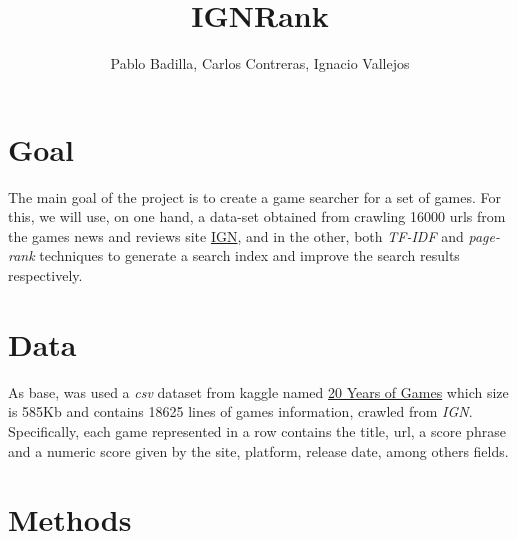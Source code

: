 \documentclass{article}
\newcommand{\instruction}[1]{\textsc{\begin{tcolorbox}#1\end{tcolorbox}}}
\begin{document}
\title{IGNRank}
\author{Pablo Badilla, Carlos Contreras, Ignacio Vallejos}

\maketitle

\renewcommand{\instruction}[1]{}

\section{Goal}

\instruction{State what is the main goal of the project. State what sorts of question(s) you want to answer or what sort of system you want to build. (Questions may be non-technical -- e.g., is there a global correlation between coffee consumption and research output -- so long as they require data analysis or other technical solutions.) [max.\ $\frac{1}{2}$ page]:}

\medskip
The main goal of the project is to create a game searcher for a set of games. For this, we will use, on one hand, a data-set obtained from crawling 16000 urls from the games news and reviews site \href{https://www.ign.com}{IGN}, and in the other, both \textit{TF-IDF} and \textit{page-rank} techniques to generate a search index and improve the search results respectively.

\section{Data}

\instruction{Describe the raw dataset that you considered for your project. Where did it come from? Why was it chosen? What information does it contain? What format was it in? What size was it? How many lines/records? [max.\ $\frac{1}{2}$ page]:}


\medskip
As base, was used a \textit{csv} dataset from kaggle named \href{https://www.kaggle.com/egrinstein/20-years-of-games}{20 Years of Games} which size is 585Kb and contains 18625 lines of games information, crawled from \textit{IGN}. Specifically, each game represented in a row contains the title, url, a score phrase and a numeric score given by the site, platform, release date, among others fields.


\section{Methods}
\end{document}
